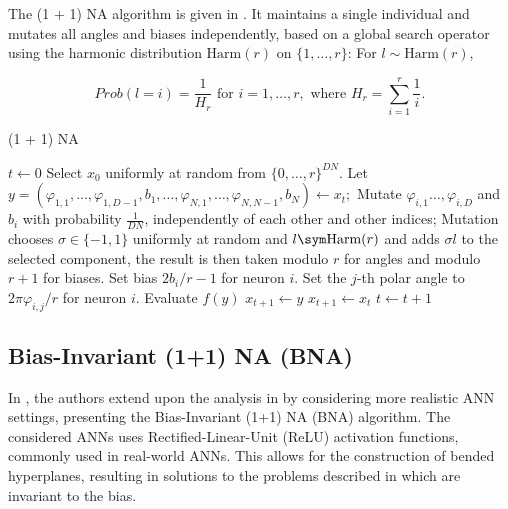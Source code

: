 The (1 + 1) NA algorithm is given in .
It maintains a single individual and mutates all angles and biases independently, based on a global search operator using the harmonic distribution
$\text{Harm}(r)$ on $\{1, \dots, r\}$: For $l \sim \text{Harm}(r)$,

\[
    Prob(l = i) = \frac{1}{H_r} \text{ for } i = 1, \dots, r, \text{ where } H_r = \sum_{i=1}^r \frac{1}{i}.
\]

\begin{algorithm}
\caption{(1 + 1) NA}
\label{alg:na}
\begin{algorithmic}
    \State $t \gets 0$
    \State Select $x_0$ uniformly at random from $\{0, \ldots, r\}^{DN}$.
        \State Let $y = (\varphi_{1,1}, \ldots, \varphi_{1,D-1}, b_1, \ldots, \varphi_{N,1}, \ldots, \varphi_{N,N-1}, b_N) \gets x_t;$
            \State Mutate $\varphi_{i,1} \dots, \varphi_{i,D}$ and $b_i$ with probability $\frac{1}{DN}$, independently of each other and other indices;
            \State Mutation chooses $\sigma \in \{-1, 1\}$ uniformly at random and $l \sym \text{Harm}(r)$ and adds $\sigma l$ to the selected component, the
            result is then taken modulo $r$ for angles and modulo $r + 1$ for biases.
                \State Set bias $2b_i / r - 1$ for neuron $i$.
                    \State Set the $j$-th polar angle to $2\pi \varphi_{i,j} / r$ for neuron $i$.
                \EndFor
            \EndFor
            \State Evaluate $f(y)$
                \State $x_{t+1} \gets y$
            \Else
                \State $x_{t+1} \gets x_t$
            \EndIf
        \EndFor
        \State $t \gets t + 1$
    \EndWhile
\end{algorithmic}
\end{algorithm}

\subsection{Bias-Invariant (1+1) NA (BNA)}

In \cite{bna}, the authors extend upon the analysis in \cite{na} by considering more realistic ANN settings, presenting the Bias-Invariant (1+1) NA (BNA) algorithm.
The considered ANNs uses Rectified-Linear-Unit (ReLU) activation functions, commonly used in real-world ANNs.
This allows for the construction of bended hyperplanes, resulting in solutions to the problems described in \cite{na} which are invariant to the bias.

